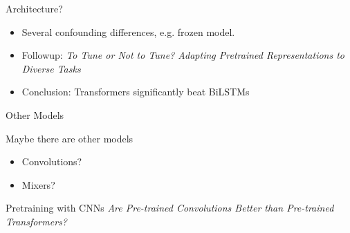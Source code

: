 \documentclass[14pt,aspectratio=169]{beamer}
\begin{document}
\begin{frame}{Architecture?}
    \begin{itemize}
        \item 
    Several confounding differences, e.g. frozen model.
       \item Followup: \textit{To Tune or Not to Tune? Adapting Pretrained Representations to Diverse Tasks} \cite{peters2019tune}
    \pause

     \item  Conclusion: Transformers significantly beat BiLSTMs
    \end{itemize}
\end{frame}

\begin{frame}{Other Models}

    Maybe there are other models

    \vspace{0.5cm}

    \begin{itemize}
        \item Convolutions?
        \item Mixers?
    \end{itemize}
    

\end{frame}

\begin{frame}{Pretraining with CNNs}
    \textit{Are Pre-trained Convolutions Better than Pre-trained Transformers?} \cite{tay2020efficient}

    \vspace{0.5cm}
    
  
\end{frame}
\end{document}
